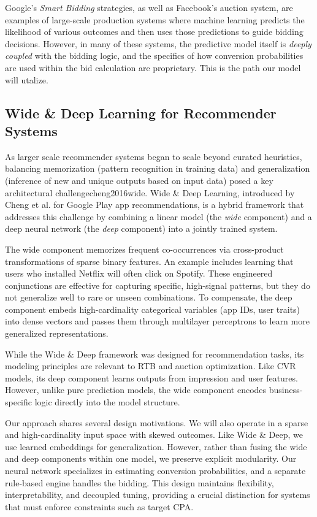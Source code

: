 \documentclass[11pt]{article}
\begin{document}
Google's \emph{Smart Bidding} strategies, as well as Facebook’s auction system, are examples of large-scale production systems where machine learning predicts the likelihood of various outcomes and then uses those predictions to guide bidding decisions. However, in many of these systems, the predictive model itself is \emph{deeply coupled} with the bidding logic, and the specifics of how conversion probabilities are used within the bid calculation are proprietary. This is the path our model will utalize.

\subsection{Wide \& Deep Learning for Recommender Systems}

As larger scale recommender systems began to scale beyond curated heuristics, balancing memorization (pattern recognition in training data) and generalization (inference of new and unique outputs based on input data) posed a key architectural challengecheng2016wide. Wide \& Deep Learning, introduced by Cheng et al. \cite{cheng2016wide} for Google Play app recommendations, is a hybrid framework that addresses this challenge by combining a linear model (the \emph{wide} component) and a deep neural network (the \emph{deep} component) into a jointly trained system.

The wide component memorizes frequent co-occurrences via cross-product transformations of sparse binary features. An example includes learning that users who installed Netflix will often click on Spotify. These engineered conjunctions are effective for capturing specific, high-signal patterns, but they do not generalize well to rare or unseen combinations. To compensate, the deep component embeds high-cardinality categorical variables (app IDs, user traits) into dense vectors and passes them through multilayer perceptrons to learn more generalized representations.

While the Wide \& Deep framework was designed for recommendation tasks, its modeling principles are relevant to RTB and auction optimization. Like CVR models, its deep component learns outputs from impression and user features. However, unlike pure prediction models, the wide component encodes business-specific logic directly into the model structure.

Our approach shares several design motivations. We will also operate in a sparse and high-cardinality input space with skewed outcomes. Like Wide \& Deep, we use learned embeddings for generalization. However, rather than fusing the wide and deep components within one model, we preserve explicit modularity. Our neural network specializes in estimating conversion probabilities, and a separate rule-based engine handles the bidding. This design maintains flexibility, interpretability, and decoupled tuning, providing a crucial distinction for systems that must enforce constraints such as target CPA.
\end{document}
